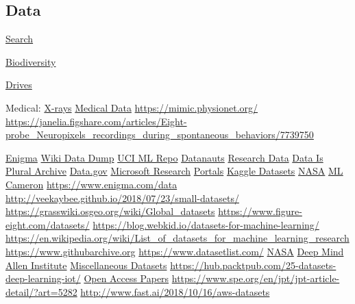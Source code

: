 \documentclass[]{book}
\begin{document}
\hypertarget{data}{%
\subsection{Data}\label{data}}

\href{https://toolbox.google.com/datasetsearch}{Search}

\href{https://www.gbif.org}{Biodiversity}

\href{https://www.backblaze.com/b2/hard-drive-test-data.html}{Drives}

Medical: \href{https://stanfordmlgroup.github.io/competitions/mura/}{X-rays} \textbar{} \href{https://github.com/beamandrew/medical-data}{Medical Data} \textbar{} \url{https://mimic.physionet.org/} \textbar{} \url{https://janelia.figshare.com/articles/Eight-probe_Neuropixels_recordings_during_spontaneous_behaviors/7739750}

\href{https://public.enigma.com/}{Enigma} \textbar{} \href{http://dumps.wikimedia.org/other/pagecounts-raw/}{Wiki Data Dump} \textbar{} \href{http://archive.ics.uci.edu/ml/}{UCI ML Repo} \textbar{} \href{https://open.nasa.gov/explore/datanauts/}{Datanauts} \textbar{} \href{http://academictorrents.com/}{Research Data} \textbar{} \href{https://docs.google.com/spreadsheets/d/1wZhPLMCHKJvwOkP4juclhjFgqIY8fQFMemwKL2c64vk/edit\#gid=0}{Data Is Plural Archive} \textbar{} \href{http://www.data.gov/}{Data.gov} \textbar{}\href{https://msropendata.com}{Microsoft Research} \textbar{} \href{https://www.opendatasoft.com/a-comprehensive-list-of-all-open-data-portals-around-the-world/}{Portals} \textbar{} \href{https://www.kaggle.com/datasets}{Kaggle Datasets} \textbar{} \href{https://open.nasa.gov/blog/}{NASA} \textbar{} \href{https://gist.github.com/olivercameron/482dcfe8f34d66b536b1048eefe8b40d\#file-datasets-csv}{ML Cameron} \textbar{} \url{https://www.enigma.com/data} \textbar{} \url{http://veekaybee.github.io/2018/07/23/small-datasets/} \textbar{} \url{https://grasswiki.osgeo.org/wiki/Global_datasets} \textbar{} \url{https://www.figure-eight.com/datasets/} \textbar{} \url{https://blog.webkid.io/datasets-for-machine-learning/} \textbar{} \url{https://en.wikipedia.org/wiki/List_of_datasets_for_machine_learning_research} \textbar{} \url{https://www.githubarchive.org} \textbar{} \url{https://www.datasetlist.com/} \textbar{} \href{https://bmtgoncalves.github.io/pyNASA/}{NASA} \textbar{} \href{https://deepmind.com/research/open-source/open-source-datasets/}{Deep Mind} \textbar{} \href{http://allenai.org/data.html}{Allen Institute} \textbar{} \href{http://users.stat.ufl.edu/~winner/datasets.html}{Miscellaneous Datasets} \textbar{} \url{https://hub.packtpub.com/25-datasets-deep-learning-iot/} \textbar{} \href{https://unpaywall.org/products/snapshot}{Open Access Papers} \textbar{} \url{https://www.spe.org/en/jpt/jpt-article-detail/?art=5282} \textbar{} \url{http://www.fast.ai/2018/10/16/aws-datasets}
\end{document}
